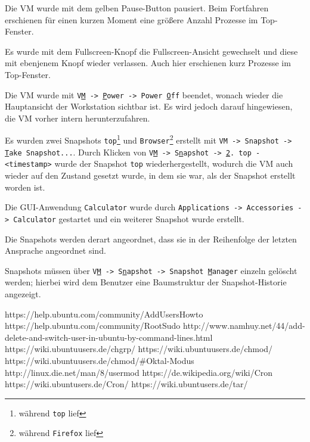 \documentclass[twoside]{article}
\begin{document}
Die VM wurde mit dem gelben Pause-Button pausiert.
Beim Fortfahren erschienen für einen kurzen Moment eine größere Anzahl Prozesse im Top-Fenster.

Es wurde mit dem Fullscreen-Knopf die Fullscreen-Ansicht gewechselt und diese mit ebenjenem Knopf wieder verlassen.
Auch hier erschienen kurz Prozesse im Top-Fenster.

Die VM wurde mit \texttt{V\underline{M} -> \underline{P}ower -> Power \underline{O}ff} beendet, wonach wieder die Hauptansicht der Workstation sichtbar ist.
Es wird jedoch darauf hingewiesen, die VM vorher intern herunterzufahren.


Es wurden zwei Snapshots \texttt{top}\footnote{während \texttt{top} lief} und \texttt{Browser}\footnote{während \texttt{Firefox} lief} erstellt mit \texttt{VM -> Snapshot -> \underline{T}ake Snapshot...}.
Durch Klicken von \texttt{V\underline{M} -> S\underline{n}apshot -> \underline{2}. top - <timestamp>} wurde der Snapshot \texttt{top} wiederhergestellt, wodurch die VM auch wieder auf den Zustand gesetzt wurde, in dem sie war, als der Snapshot erstellt worden ist.

Die GUI-Anwendung \texttt{Calculator} wurde durch \texttt{Applications -> Accessories -> Calculator} gestartet und ein weiterer Snapshot wurde erstellt.

Die Snapshots werden derart angeordnet, dass sie in der Reihenfolge der letzten Ansprache angeordnet sind.

Snapshots müssen über \texttt{V\underline{M} -> S\underline{n}apshot -> Snapshot \underline{M}anager} einzeln gelöscht werden; hierbei wird dem Benutzer eine Baumstruktur der Snapshot-Historie angezeigt.


\begin{thebibliography}{1}
 https://help.ubuntu.com/community/AddUsersHowto
 https://help.ubuntu.com/community/RootSudo
 http://www.namhuy.net/44/add-delete-and-switch-user-in-ubuntu-by-command-lines.html
 https://wiki.ubuntuusers.de/chgrp/
 https://wiki.ubuntuusers.de/chmod/
 https://wiki.ubuntuusers.de/chmod/\string#Oktal-Modus
 http://linux.die.net/man/8/usermod
 https://de.wikipedia.org/wiki/Cron
 https://wiki.ubuntusers.de/Cron/
 https://wiki.ubuntusers.de/tar/
\end{thebibliography}
\end{document}
